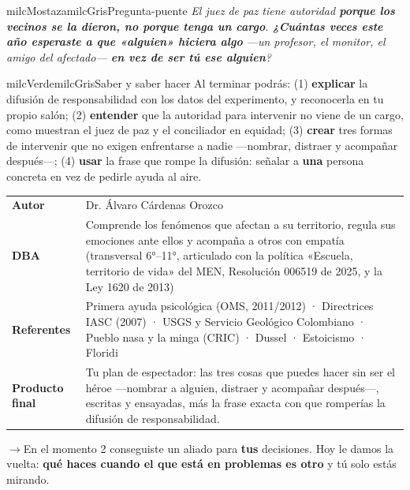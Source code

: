 \documentclass[11pt,letterpaper]{article}
\newcommand{\puente}[1]{%
  \begin{puentebox}%
    \textcolor{milcGradeDark}{$\rightarrow$}\hspace{2mm}#1%
  \end{puentebox}%
}
\begin{document}
\begin{softbox}{milcMostaza}{milcGris}{Pregunta-puente}
\textit{El juez de paz tiene autoridad \textbf{porque los vecinos se la dieron, no porque tenga un cargo}. \textbf{¿Cuántas veces este año esperaste a que «alguien» hiciera algo} ---un profesor, el monitor, el amigo del afectado--- \textbf{en vez de ser tú ese alguien}?}
\end{softbox}

\begin{softbox}{milcVerde}{milcGris}{Saber y saber hacer}
Al terminar podrás: (1) \textbf{explicar} la difusión de responsabilidad con los datos del experimento, y reconocerla en tu propio salón; (2) \textbf{entender} que la autoridad para intervenir no viene de un cargo, como muestran el juez de paz y el conciliador en equidad; (3) \textbf{crear} tres formas de intervenir que no exigen enfrentarse a nadie ---nombrar, distraer y acompañar después---; (4) \textbf{usar} la frase que rompe la difusión: señalar a \textbf{una} persona concreta en vez de pedirle ayuda al aire.
\end{softbox}



\small
\begin{tabularx}{\textwidth}{>{\bfseries}p{3.0cm}Y}
Autor & Dr. Álvaro Cárdenas Orozco\\
DBA & Comprende los fenómenos que afectan a su territorio, regula sus emociones ante ellos y acompaña a otros con empatía (transversal 6°--11°, articulado con la política «Escuela, territorio de vida» del MEN, Resolución 006519 de 2025, y la Ley 1620 de 2013)\\
Referentes & Primera ayuda psicológica (OMS, 2011/2012) · Directrices IASC (2007) · USGS y Servicio Geológico Colombiano · Pueblo nasa y la minga (CRIC) · Dussel · Estoicismo · Floridi\\
Producto final & Tu plan de espectador: las tres cosas que puedes hacer sin ser el héroe —nombrar a alguien, distraer y acompañar después—, escritas y ensayadas, más la frase exacta con que romperías la difusión de responsabilidad.\\
\end{tabularx}
\normalsize

\puente{En el momento 2 conseguiste un aliado para \textbf{tus} decisiones. Hoy le damos la vuelta: \textbf{qué haces cuando el que está en problemas es otro} y tú solo estás mirando.}
\end{document}

